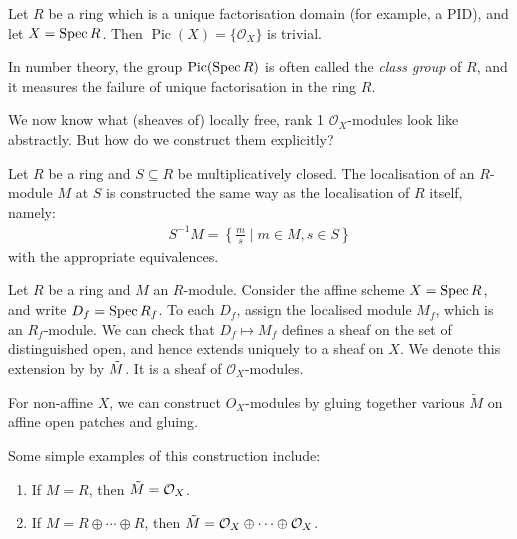 \begin{theorem} \label{prop: pic trivial on ufd}
	Let $R$ be a ring which is a unique factorisation domain (for example, a PID), and let $X = \operatorname{Spec} R$. Then $\operatorname{Pic}(X) = \{\mathcal{O}_X\}$ is trivial.
\end{theorem}

\begin{remark}
	In number theory, the group $\operatorname{Pic}(\operatorname{Spec} R)$ is often called the \emph{class group} of $R$, and it measures the failure of unique factorisation in the ring $R$.
\end{remark}

We now know what (sheaves of) locally free, rank 1 $\mathcal{O}_X$-modules look like abstractly. But how do we construct them explicitly? 

\begin{definition}
	Let $R$ be a ring and $S \subseteq R$ be multiplicatively closed. The localisation of an $R$-module $M$ at $S$ is constructed the same way as the localisation of $R$ itself, namely:
	\begin{align*}
		S^{-1} M = \left\{ \frac{m}{s} \; \Big\vert \; m\in M, s \in S  \right\}
	\end{align*}
	with the appropriate equivalences.
\end{definition}

\begin{definition}
  Let $R$ be a ring and $M$ an $R$-module. Consider the affine scheme $X = \operatorname{Spec} R$, and write $D_f = \operatorname{Spec} R_f$. To each $D_f$, assign the localised module $M_f$, which is an $R_f$-module.  We can check that \(D_f \mapsto M_f\) defines a sheaf on the set of distinguished open, and hence extends uniquely to a sheaf on \(X\).
  We denote this extension by by $\Tilde{M}$.  It is a sheaf of $\mathcal{O}_X$-modules.

  For non-affine \(X\), we can construct \(O_X\)-modules by gluing together various \(\widetilde M\) on affine open patches and gluing.
\end{definition}

\begin{example}
	Some simple examples of this construction include:
	\begin{enumerate}
		\item If $M = R$, then $\Tilde{M} = \mathcal{O}_X$. 
		\item If $M = R \oplus \cdots \oplus R$, then $\Tilde{M} = \mathcal{O}_X \oplus \cdots \oplus \mathcal{O}_X$.
	\end{enumerate}
\end{example}

